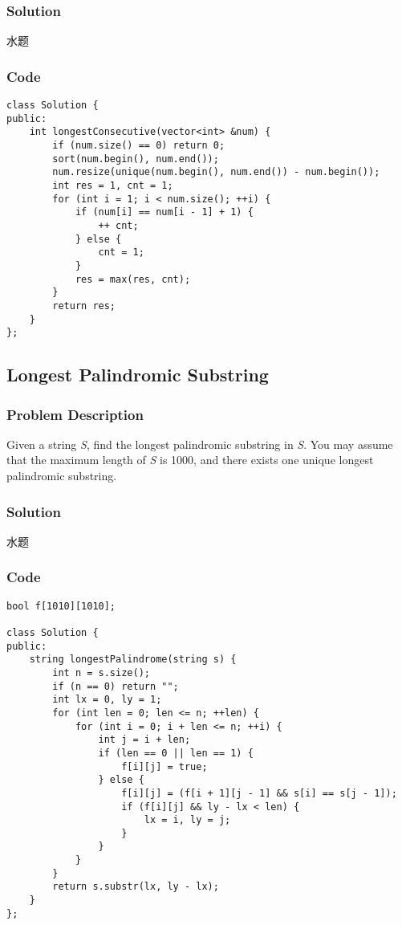 \documentclass[courier]{article}
\begin{document}
\begin{CJK*}{UTF8}{gkai}
\subsubsection*{Solution}
水题

\subsubsection*{Code}
\begin{lstlisting}
class Solution {
public:
    int longestConsecutive(vector<int> &num) {
        if (num.size() == 0) return 0;
        sort(num.begin(), num.end());
        num.resize(unique(num.begin(), num.end()) - num.begin());
        int res = 1, cnt = 1;
        for (int i = 1; i < num.size(); ++i) {
            if (num[i] == num[i - 1] + 1) {
                ++ cnt;
            } else {
                cnt = 1;
            }
            res = max(res, cnt);
        }
        return res;        
    }
};

\end{lstlisting}


\subsection{ Longest Palindromic Substring }

\subsubsection*{Problem Description}
Given a string \emph{S}, find the longest palindromic substring in \emph{S}. You may assume that the maximum length of \emph{S} is 1000, and there exists one unique longest palindromic substring.



\subsubsection*{Solution}
水题

\subsubsection*{Code}
\begin{lstlisting}
bool f[1010][1010];

class Solution {
public:
    string longestPalindrome(string s) {
        int n = s.size();
        if (n == 0) return "";
        int lx = 0, ly = 1;
        for (int len = 0; len <= n; ++len) {
            for (int i = 0; i + len <= n; ++i) {
                int j = i + len;
                if (len == 0 || len == 1) {
                    f[i][j] = true;
                } else {
                    f[i][j] = (f[i + 1][j - 1] && s[i] == s[j - 1]);
                    if (f[i][j] && ly - lx < len) {
                        lx = i, ly = j;
                    }
                }
            }
        }
        return s.substr(lx, ly - lx);
    }
};


\end{lstlisting}
\end{CJK*}
\end{document}
